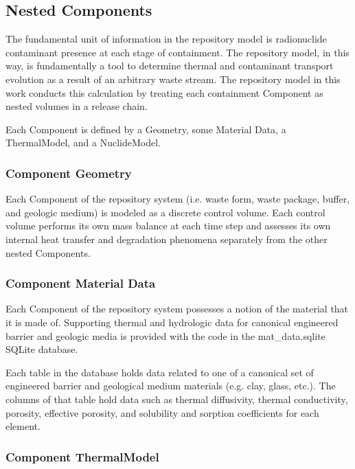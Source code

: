 \subsection{Nested Components}

The fundamental unit of information in the repository model is radionuclide 
contaminant presence at each stage of containment.  The repository model, in 
this way, is fundamentally a tool to determine thermal and contaminant 
transport evolution as a result of an arbitrary waste stream. The repository 
model in this work conducts this calculation by  treating each containment 
Component as nested volumes in a release chain. 

Each Component is defined by a Geometry, some Material Data, a ThermalModel, 
and a NuclideModel.

\subsubsection{Component Geometry}

Each Component of the repository system (i.e. waste form, waste package, buffer, 
and geologic medium) is modeled as a discrete control volume. Each control 
volume performs its own mass balance at each time step and assesses its own 
internal  heat transfer and degradation phenomena separately from the other 
nested Components.

\subsubsection{Component Material Data}

Each Component of the repository system possesses a notion of the material that 
it is made of. Supporting thermal and hydrologic data for canonical engineered 
barrier and geologic media is provided with the code in the 
mat\_data.sqlite SQLite database.

Each table in the database holds data related to one of a canonical set of 
engineered barrier and geological medium materials (e.g. clay, glass, etc.).  
The columns of that table hold data such as thermal diffusivity, thermal 
conductivity, porosity, effective porosity, and solubility and sorption 
coefficients for each element.  

\subsubsection{Component ThermalModel}

